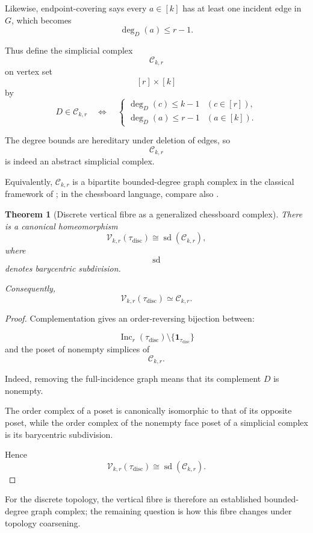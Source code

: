 \documentclass[11pt]{article}
\theoremstyle{plain}
\newtheorem{theorem}{Theorem}[section]
\theoremstyle{definition}
\begin{document}
Likewise, endpoint-covering says every
$a\in[k]$ has at least one incident edge in $G$, which becomes
\[
\deg_D(a)\leq r-1.
\]

Thus define the simplicial complex
\[
\mathcal C_{k,r}
\]
on vertex set
\[
[r]\times[k]
\]
by
\[
D\in\mathcal C_{k,r}
\quad\Longleftrightarrow\quad
\begin{cases}
\deg_D(c)\leq k-1
& (c\in[r]),\\[1mm]
\deg_D(a)\leq r-1
& (a\in[k]).
\end{cases}
\]

The degree bounds are hereditary under deletion of edges, so
\[
\mathcal C_{k,r}
\]
is indeed an abstract simplicial complex.

Equivalently, $\mathcal C_{k,r}$ is a bipartite bounded-degree graph complex in the classical framework of \citet{KaraguezianReinerWachs2001}; in the chessboard language, compare also \citet{JojicVrecicaZivaljevic2017}.

\begin{theorem}[Discrete vertical fibre as a generalized chessboard complex]
\label{thm:discrete-vertical-chessboard}
There is a canonical homeomorphism
\[
\mathcal V_{k,r}(\tau_{\mathrm{disc}})
\cong
\operatorname{sd}(\mathcal C_{k,r}),
\]
where
\[
\operatorname{sd}
\]
denotes barycentric subdivision.

Consequently,
\[
\mathcal V_{k,r}(\tau_{\mathrm{disc}})
\simeq
\mathcal C_{k,r}.
\]
\end{theorem}

\begin{proof}
Complementation gives an order-reversing bijection between:

\[
\operatorname{Inc}_r(\tau_{\mathrm{disc}})
\setminus
\{\mathbf1_{\tau_{\mathrm{disc}}}\}
\]
and the poset of nonempty simplices of
\[
\mathcal C_{k,r}.
\]

Indeed, removing the full-incidence graph means that its complement
$D$ is nonempty.

The order complex of a poset is canonically isomorphic to that of its
opposite poset, while the order complex of the nonempty face poset of a
simplicial complex is its barycentric subdivision.

Hence
\[
\mathcal V_{k,r}(\tau_{\mathrm{disc}})
\cong
\operatorname{sd}(\mathcal C_{k,r}).
\]
\end{proof}

For the discrete topology, the vertical fibre is therefore an established bounded-degree graph complex; the remaining question is how this fibre changes under topology coarsening.
\end{document}
